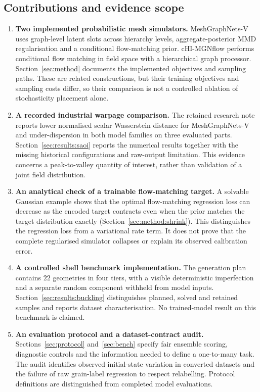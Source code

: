 \subsection{Contributions and evidence scope}
\label{sec:intro:contributions}

\begin{enumerate}
  \item \textbf{Two implemented probabilistic mesh simulators.}
    MeshGraphNets-V uses graph-level latent slots across hierarchy levels,
    aggregate-posterior MMD regularisation and a conditional flow-matching
    prior. cHI-MGNflow performs conditional flow matching in field space with
    a hierarchical graph processor. Section~\ref{sec:method} documents the
    implemented objectives and sampling paths. These are related constructions,
    but their training objectives and sampling costs differ, so their
    comparison is not a controlled ablation of stochasticity placement alone.
  \item \textbf{A recorded industrial warpage comparison.}
    The retained research note reports lower normalised scalar Wasserstein
    distance for MeshGraphNets-V and under-dispersion in both model families
    on three evaluated parts. Section~\ref{sec:results:saoi} reports the
    numerical results together with the missing historical configurations and
    raw-output limitation. This evidence concerns a peak-to-valley quantity of
    interest, rather than validation of a joint field distribution.
  \item \textbf{An analytical check of a trainable flow-matching target.}
    A solvable Gaussian example shows that the optimal flow-matching
    regression loss can decrease as the encoded target contracts even when
    the prior matches the target distribution exactly
    (Section~\ref{sec:method:shrink}). This distinguishes the regression loss
    from a variational rate term. It does not prove that the complete
    regularised simulator collapses or explain its observed calibration error.
  \item \textbf{A controlled shell benchmark implementation.}
    The generation plan contains $22$ geometries in four tiers, with a visible
    deterministic imperfection and a separate random component withheld from
    model inputs. Section~\ref{sec:results:buckling} distinguishes planned,
    solved and retained samples and reports dataset characterisation. No
    trained-model result on this benchmark is claimed.
  \item \textbf{An evaluation protocol and a dataset-contract audit.}
    Sections~\ref{sec:protocol} and~\ref{sec:bench} specify fair ensemble
    scoring, diagnostic controls and the information needed to define a
    one-to-many task. The audit identifies observed initial-state variation
    in converted datasets and the failure of raw grain-label regression to
    respect relabelling. Protocol definitions are distinguished from completed
    model evaluations.
\end{enumerate}

